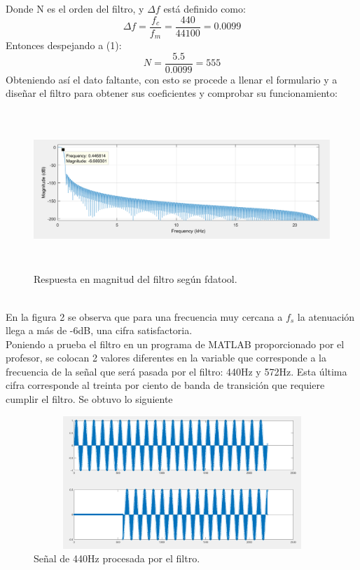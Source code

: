 \documentclass[12pt]{article}
\begin{document}
Donde N es el orden del filtro, y $\Delta f$ está definido como:
\begin{equation}
    \Delta f = \dfrac{f_{c}}{f_{m}} = \dfrac{440}{44100} = 0.0099
\end{equation}
Entonces despejando a (1):
\begin{equation}
    N = \dfrac{5.5}{0.0099} = 555
\end{equation}
Obteniendo así el dato faltante, con esto se procede a llenar el formulario y a diseñar el filtro para obtener sus coeficientes y comprobar su funcionamiento:
\\
  \begin{figure}[h]
        \centering
        \includegraphics[width=14cm, height=6cm]{imagenes/resp_magn.png}
        \caption{Respuesta en magnitud del filtro según fdatool.}
    \end{figure}
    \\
En la figura 2 se observa que para una frecuencia muy cercana a $f_{s}$ la atenuación llega a más de -6dB, una cifra satisfactoria. 
\\
Poniendo a prueba el filtro en un programa de MATLAB proporcionado por el profesor, se colocan 2 valores diferentes en la variable que corresponde a la frecuencia de la señal que será pasada por el filtro: 440Hz y 572Hz. Esta última cifra corresponde al treinta por ciento de banda de transición que requiere cumplir el filtro. Se obtuvo lo siguiente
  \begin{figure}[h]
        \centering
        \includegraphics[width=14cm, height=5cm]{imagenes/respFIR_440.png}
        \caption{Señal de 440Hz procesada por el filtro.}
    \end{figure}
\end{document}
